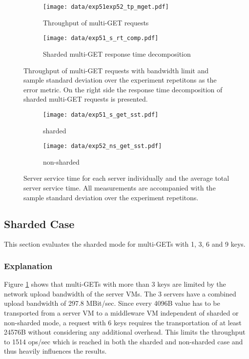 \documentclass[report.tex]{subfiles}
\begin{document}
\begin{figure}[H]
	\begin{subfigure}[b]{.49\linewidth}
		\centering
		\texttt{[image: data/exp51exp52\_tp\_mget.pdf]}
		\caption{Throughput of multi-GET requests }\label{exp5_tp}
	\end{subfigure}\hfill
	\begin{subfigure}[b]{.49\linewidth}
		\centering
		\texttt{[image: data/exp51\_s\_rt\_comp.pdf]}
		\caption{Sharded multi-GET response time decomposition}\label{exp51_s_rt_comp}
	\end{subfigure}%
	\caption{Throughput of multi-GET requests with bandwidth limit and sample standard deviation over the experiment repetitons as the error metric. On the right side  the response time decomposition of sharded multi-GET requests is presented.}
\end{figure}


\begin{figure}[H]
	\begin{subfigure}[b]{.49\linewidth}
		\centering
		\texttt{[image: data/exp51\_s\_get\_sst.pdf]}
		\caption{sharded}\label{exp51_s_get_sst}
	\end{subfigure}\hfill
	\begin{subfigure}[b]{.49\linewidth}
		\centering
		\texttt{[image: data/exp52\_ns\_get\_sst.pdf]}
		\caption{non-sharded}\label{exp52_s_get_sst}
	\end{subfigure}%
	\caption{Server service time for each server individually and the average total server service time. All measurements are accompanied with the sample standard deviation over the experiment repetitons.}
\end{figure}

\subsection{Sharded Case}

This section evaluates the sharded mode for multi-GETs with 1, 3, 6 and 9 keys.

\subsubsection{Explanation}

Figure \ref{exp5_tp} shows that multi-GETs with more than 3 keys are limited by the network upload bandwidth of the server VMs. The 3 servers have a combined upload bandwidth of 297.8 MBit/sec. Since every 4096B value has to be transported from a server VM to a middleware VM independent of sharded or non-sharded mode, a request with 6 keys requires the transportation of at least 24576B without considering any additional overhead. This limits the throughput to 1514 ops/sec which is reached in both the sharded and non-sharded case and thus heavily influences the results.
\end{document}
